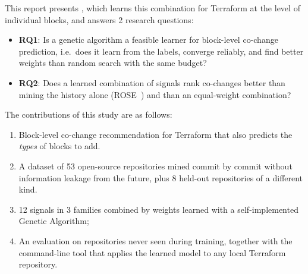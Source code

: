 This report presents \tool, which learns this combination for Terraform at the level of
individual blocks, and answers 2 research questions:
\begin{itemize}
  \item \textbf{RQ1}: Is a genetic algorithm a feasible learner for block-level co-change
  prediction, i.e.\ does it learn from the labels, converge reliably, and find better weights than
  random search with the same budget?
  \item \textbf{RQ2}: Does a learned combination of signals rank co-changes better than mining the
  history alone (ROSE~\cite{zimmermann2004rose}) and than an equal-weight combination?
\end{itemize}

The contributions of this study are as follows:
\begin{enumerate}
    \item Block-level co-change recommendation for Terraform that also predicts
        the \emph{types} of blocks to add.
    \item A dataset of 53 open-source repositories mined commit by
        commit without information leakage from the future, plus 8 held-out repositories of a
        different kind.
    \item 12 signals in 3 families combined
        by weights learned with a self-implemented Genetic Algorithm;
    \item An evaluation on
        repositories never seen during training, together with the \tool{} command-line tool that applies
        the learned model to any local Terraform repository.
\end{enumerate}